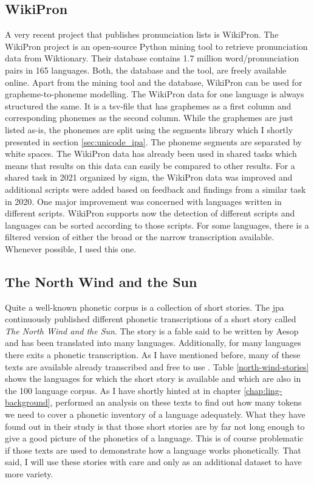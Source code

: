 \subsection{WikiPron}
A very recent project that publishes pronunciation lists is WikiPron. The WikiPron project \citep{Lee&Ashby.2020} is an open-source Python mining tool to retrieve pronunciation data from Wiktionary. Their database contains 1.7 million word/pronunciation pairs in 165 languages. Both, the database and the tool, are freely available online. Apart from the mining tool and the database, WikiPron can be used for grapheme-to-phoneme modelling. The WikiPron data for one language is always structured the same. It is a tsv-file that has graphemes as a first column and corresponding phonemes as the second column. While the graphemes are just listed as-is, the phonemes are split using the segments library which I shortly presented in section \ref{sec:unicode_ipa}. The phoneme segments are separated by white spaces. 
The WikiPron data has already been used in shared tasks which means that results on this data can easily be compared to other results. For a shared task in 2021 organized by \ac{sigm}, the WikiPron data was improved and additional scripts were added based on feedback and findings from a similar task in 2020. One major improvement was concerned with languages written in different scripts. WikiPron supports now the detection of different scripts and languages can be sorted according to those scripts. For some languages, there is a filtered version of either the broad or the narrow transcription available. Whenever possible, I used this one.


\subsection{The North Wind and the Sun}
\label{nws}
Quite a well-known phonetic corpus is a collection of short stories. The \ac{jpa} continuously published different phonetic transcriptions of a short story called \textit{The North Wind and the Sun}. The story is a fable said to be written by Aesop and has been translated into many languages. Additionally, for many languages there exits a phonetic transcription. As I have mentioned before, many of these texts are available already transcribed and free to use \citep{GitHub.04.02.2022}. Table \ref{north-wind-stories} shows the languages for which the short story is available and which are also in the 100 language corpus. As I have shortly hinted at in chapter \ref{chap:ling-background}, \citet{baird_evans_greenhill_2021} performed an analysis on these texts to find out how many tokens we need to cover a phonetic inventory of a language adequately. What they have found out in their study is that those short stories are by far not long enough to give a good picture of the phonetics of a language. This is of course problematic if those texts are used to demonstrate how a language works phonetically. That said, I will use these stories with care and only as an additional dataset to have more variety.

